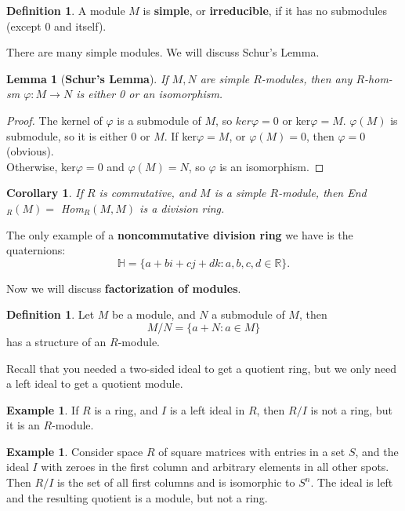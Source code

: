 \documentclass[12pt]{amsbook}
\theoremstyle{plain}
\numberwithin{section}{chapter}
\numberwithin{equation}{chapter}
\newtheorem{lem}[theorem]{Lemma}
\newtheorem{Cor}[theorem]{Corollary}
\theoremstyle{definition}
\newtheorem{Def}[theorem]{Definition}
\newtheorem{Ex}[theorem]{Example}
\theoremstyle{remark}
\renewcommand{\phi}{\varphi}
\begin{document}
\begin{Def}
A module $M$ is \textbf{simple}, or \textbf{irreducible}, if it has no submodules (except $0$ and itself). 
\end{Def}
There are many simple modules. We will discuss Schur's Lemma. 

\begin{lem}[\textbf{Schur's Lemma}]
If $M,N$ are simple $R$-modules, then any $R$-hom-sm $\phi: M \to N$ is either 0 or an isomorphism. 
\end{lem}

\begin{proof}
The kernel of $\phi$ is a submodule of $M$, so $ker\phi = 0$ or ker$\phi = M$. $\phi(M)$ is submodule, so it is either $0$ or $M$. If ker$\phi = M$, or $\phi(M) = 0$, then $\phi = 0$ (obvious). \\
Otherwise, ker$\phi = 0$ and $\phi(M) = N$, so $\phi$ is an isomorphism. 
\end{proof}
\begin{Cor}
If $R$ is commutative, and $M$ is a simple $R$-module, then End$_R(M) = $ Hom$_R(M,M)$ is a division ring. 
\end{Cor}

The only example of a \textbf{noncommutative division ring} we have is the quaternions:
 $$
\mathbb{H} = \{a + bi + cj + dk:a,b,c,d \in \mathbb{R}\}.
$$

Now we will discuss \textbf{factorization of modules}. 
\begin{Def}
Let $M$ be a module, and $N$ a submodule of $M$, then 
$$
M/N = \{a + N: a \in M\}
$$
has a structure of an $R$-module. 
\end{Def}

Recall that you needed a two-sided ideal to get a quotient ring, but we only need a left ideal to get a quotient module. 

\begin{Ex}
If $R$ is a ring, and $I$ is a left ideal in $R$, then $R/I$ is not a ring, but it is an $R$-module. 
\end{Ex}

\begin{Ex}
Consider space $R$ of square matrices with entries in a set $S$, and the ideal $I$ with zeroes in the first column and arbitrary elements in all other spots. Then $R/I$ is the set of all first columns and is isomorphic to $S^n$. The ideal is left and the resulting quotient is a module, but not a ring. 
\end{Ex}
\end{document}
